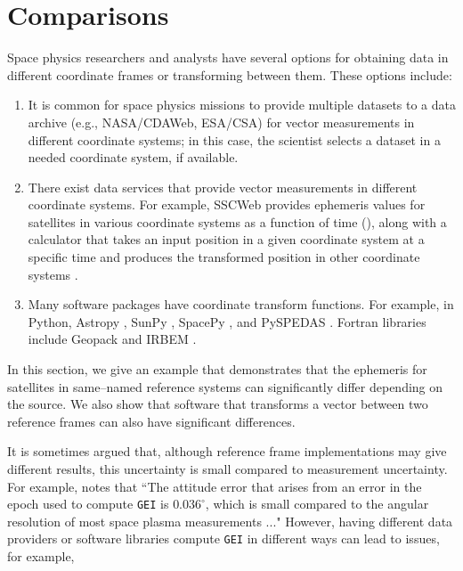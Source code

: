 \documentclass[draft]{agujournal2019}
\begin{document}

\section{Comparisons}
\label{sect:comparisons}

Space physics researchers and analysts have several options for obtaining data in different coordinate frames or transforming between them. These options include:

\begin{enumerate}

    \parskip 0.1in 

    \item It is common for space physics missions to provide multiple datasets to a data archive (e.g., NASA/CDAWeb, ESA/CSA) for vector measurements in different coordinate systems; in this case, the scientist selects a dataset in a needed coordinate system, if available.

    \item There exist data services that provide vector measurements in different coordinate systems. For example, SSCWeb provides ephemeris values for satellites in various coordinate systems as a function of time (\cite{SSCWeb}), along with a calculator that takes an input position in a given coordinate system at a specific time and produces the transformed position in other coordinate systems \cite{SSCWebCoordinateCalculator}. 

    \item Many software packages have coordinate transform functions. For example, in Python, Astropy \cite{AstroPy2022}, SunPy \cite{SunPy}, SpacePy \cite{SpacePy}, and PySPEDAS \cite{Angelopoulos2024}. Fortran libraries include Geopack \cite{Tsyganenko2008} and IRBEM \cite{IRBEM2022}.

\end{enumerate}

In this section, we give an example that demonstrates that the ephemeris for satellites in same--named reference systems can significantly differ depending on the source. We also show that software that transforms a vector between two reference frames can also have significant differences.

It is sometimes argued that, although reference frame implementations may give different results, this uncertainty is small compared to measurement uncertainty. For example,  notes that ``The attitude error that arises from an error in the epoch used to compute \texttt{GEI} is $0.036^\circ$, which is small compared to the angular resolution of most space plasma measurements ..."
However, having different data providers or software libraries compute \texttt{GEI} in different ways can lead to issues, for example, 
\end{document}
